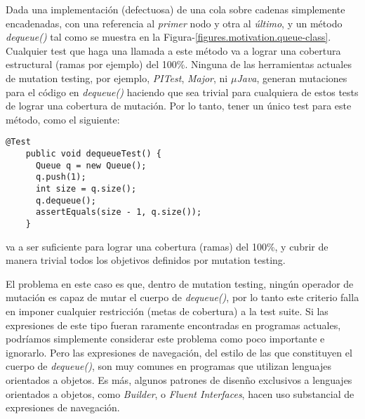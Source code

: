 Dada una implementaci\'on (defectuosa) de una cola sobre cadenas simplemente encadenadas, con una referencia al \emph{primer} nodo y otra al \emph{\'ultimo}, y un m\'etodo \emph{dequeue()} tal como se muestra en la Figura-\ref{figures.motivation.queue-class}. Cualquier test que haga una llamada a este m\'etodo va a lograr una cobertura estructural (ramas por ejemplo) del 100\%.
Ninguna de las herramientas actuales de mutation testing, por ejemplo, \emph{PITest}, \emph{Major}, ni \emph{$\mu$Java}, generan mutaciones para el c\'odigo en \emph{dequeue()} haciendo que sea trivial para cualquiera de estos tests de lograr una cobertura de mutaci\'on. Por lo tanto, tener un \'unico test para este m\'etodo, como el siguiente:
\begin{center}
	\begin{lstlisting}[frame=tlrb, mathescape=true]
    @Test
    public void dequeueTest() {
      Queue q = new Queue();
      q.push(1);
      int size = q.size();
      q.dequeue();
      assertEquals(size - 1, q.size());
    }
	\end{lstlisting}
\end{center}
va a ser suficiente para lograr una cobertura (ramas) del 100\%, y cubrir de manera trivial todos los objetivos definidos por mutation testing.

El problema en este caso es que, dentro de mutation testing, ning\'un operador de mutaci\'on es capaz de mutar el cuerpo de \emph{dequeue()}, por lo tanto este criterio falla en imponer cualquier restricci\'on (metas de cobertura) a la test suite. Si las expresiones de este tipo fueran raramente encontradas en programas actuales, podr\'iamos simplemente considerar este problema como poco importante e ignorarlo. Pero las expresiones de navegaci\'on, del estilo de las que constituyen el cuerpo de \emph{dequeue()}, son muy comunes en programas que utilizan lenguajes orientados a objetos. Es m\'as, algunos patrones de disen\~no exclusivos a lenguajes orientados a objetos, como \emph{Builder}, o \emph{Fluent Interfaces}, hacen uso substancial de expresiones de navegaci\'on.

